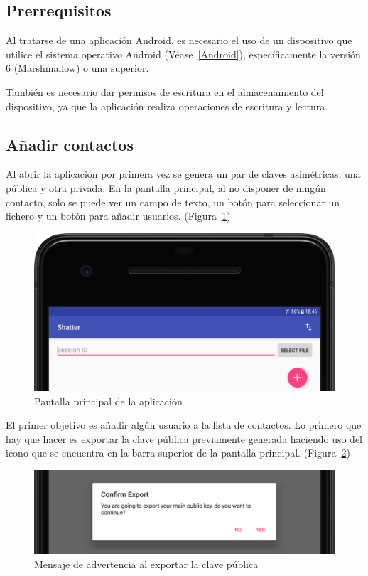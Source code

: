 \subsection{Prerrequisitos}

Al tratarse de una aplicación Android, es necesario el uso de un dispositivo que utilice el sistema operativo Android (Véase~\ref{Android}), específicamente la versión 6 (Marshmallow) o una superior.

También es necesario dar permisos de escritura en el almacenamiento del dispositivo, ya que la aplicación realiza operaciones de escritura y lectura.

\subsection{Añadir contactos}

Al abrir la aplicación por primera vez se genera un par de claves asimétricas, una pública y otra privada. En la pantalla principal, al no disponer de ningún contacto, solo se puede ver un campo de texto, un botón para seleccionar un fichero y un botón para añadir usuarios. (Figura~\ref{fig:home})

\begin{figure}[!htb]
  \centering
  \includegraphics[scale=0.4]{Figures/home}
  \decoRule
  \caption[Shatter (\emph{Home})]{Pantalla principal de la aplicación}
  \label{fig:home}
\end{figure}

El primer objetivo es añadir algún usuario a la lista de contactos. Lo primero que hay que hacer es exportar la clave pública previamente generada haciendo uso del icono que se encuentra en la barra superior de la pantalla principal. (Figura~\ref{fig:export})

\begin{figure}[!htb]
  \centering
  \includegraphics[scale=0.4]{Figures/export}
  \decoRule
  \caption[Shatter (Exportar clave pública)]{Mensaje de advertencia al exportar la clave pública}
  \label{fig:export}
\end{figure}

